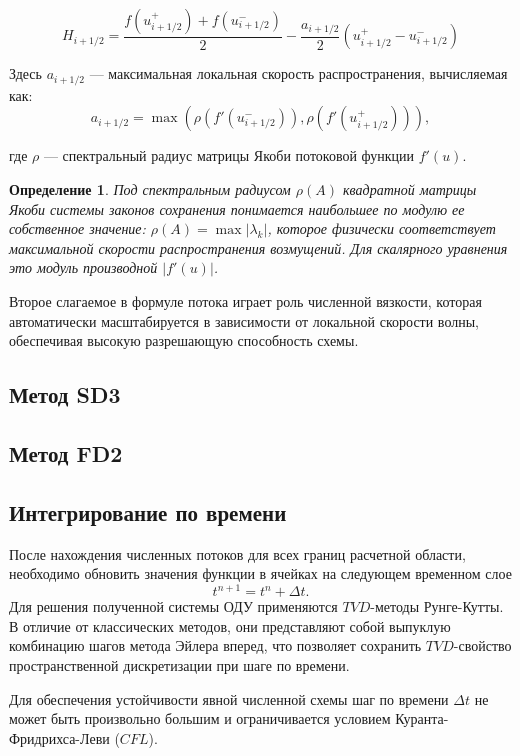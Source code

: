 \documentclass[12pt, a4paper]{article}
\theoremstyle{gostdef}
\newtheorem{defenv}{Определение}[section]
\begin{document}
	\[
		H_{i+1/2} = \frac{f(u_{i+1/2}^+)+f(u_{i+1/2}^-)}{2} - \frac{a_{i+1/2}}{2} \left( u_{i+1/2}^+ - u_{i+1/2}^- \right)
	\]
	
	Здесь \(a_{i+1/2}\) — максимальная локальная скорость распространения, вычисляемая как:
	\[
	a_{i+1/2} = \max \left( \rho \left( f'(u_{i+1/2}^-) \right), \rho \left( f'(u_{i+1/2}^+) \right) \right),
	\]
	
	где $\rho$ --- спектральный радиус матрицы Якоби потоковой функции $f'(u)$. 
	
	\begin{defenv}
		Под спектральным радиусом $\rho(A)$ квадратной матрицы Якоби системы законов сохранения понимается наибольшее по модулю ее собственное значение: $\rho(A) = \max|\lambda_k|$, которое физически соответствует максимальной скорости распространения возмущений. Для скалярного уравнения это модуль производной $|f'(u)|$.
	\end{defenv}
	
	Второе слагаемое в формуле потока играет роль численной вязкости, которая автоматически масштабируется в зависимости от локальной скорости волны, обеспечивая высокую разрешающую способность схемы.
	
	\subsection{Метод SD3}
	
	\subsection{Метод FD2}
	
	\subsection{Интегрирование по времени}
	
	После нахождения численных потоков для всех границ расчетной области, необходимо обновить значения функции в ячейках на следующем временном слое 
	\[
		t^{n + 1} = t^n + \Delta t.
	\] 
	Для решения полученной системы ОДУ применяются $TVD$-методы Рунге-Кутты. В отличие от классических методов, они представляют собой выпуклую комбинацию шагов метода Эйлера вперед, что позволяет сохранить $TVD$-свойство пространственной дискретизации при шаге по времени.
	
	Для обеспечения устойчивости явной численной схемы шаг по времени $\Delta t$ не может быть произвольно большим и ограничивается условием Куранта-Фридрихса-Леви ($CFL$).
	
\end{document}
